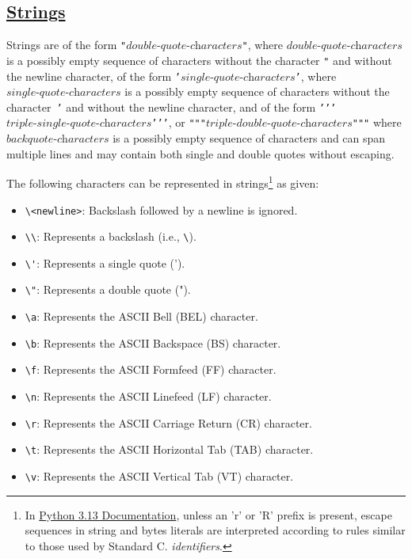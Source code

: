 \subsection*{\href{https://sourceacademy.org/sicpjs/2.3.1}{Strings}}

Strings are of the form \texttt{"}$ \textit{double-quote-characters} $\texttt{"},
where $\textit{double-quote-characters}$ is a possibly empty sequence of characters without
the character \texttt{"} and without the newline character, 
of the form
\texttt{'}$ \textit{single-quote-characters} $\texttt{'},
where $\textit{single-quote-characters}$ is a possibly empty sequence of characters without
the character~\texttt{'} and without the newline character,
and of the form
\texttt{'}\texttt{'}\texttt{'}$ \textit{triple-single-quote-characters} $\texttt{'}\texttt{'}\texttt{'}, or 
\texttt{"""}$ \textit{triple-double-quote-characters} $\texttt{"""}
where $\textit{backquote-characters}$ is a possibly empty sequence of characters and 
can span multiple lines and may contain both single and double quotes without escaping.

The following characters can be represented in strings\footnote{
In \href{https://docs.python.org/3/reference/lexical_analysis.html}{
\color{DarkBlue} Python 3.13 Documentation},
unless an 'r' or 'R' prefix is present, escape sequences in string and bytes literals are interpreted according to rules similar to those used by Standard C. \emph{identifiers}.
} as given:
\begin{itemize}
    \item \verb|\<newline>|: Backslash followed by a newline is ignored.
    \item \verb|\\|: Represents a backslash (i.e., \texttt{\textbackslash}).
    \item \verb|\'|: Represents a single quote (').
    \item \verb|\"|: Represents a double quote (").
    \item \verb|\a|: Represents the ASCII Bell (BEL) character.
    \item \verb|\b|: Represents the ASCII Backspace (BS) character.
    \item \verb|\f|: Represents the ASCII Formfeed (FF) character.
    \item \verb|\n|: Represents the ASCII Linefeed (LF) character.
    \item \verb|\r|: Represents the ASCII Carriage Return (CR) character.
    \item \verb|\t|: Represents the ASCII Horizontal Tab (TAB) character.
    \item \verb|\v|: Represents the ASCII Vertical Tab (VT) character.
\end{itemize}
